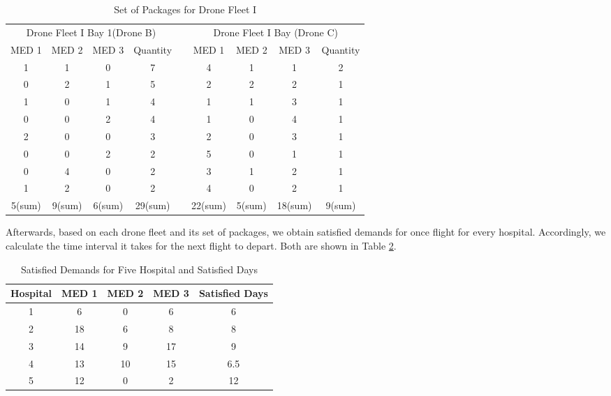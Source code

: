 \documentclass{mcmthesis}
\begin{document}
\begin{table}[htbp]
  \centering
  \caption{Set of Packages for Drone Fleet I}
    \begin{tabular}{ccccccccc}
    \hline
    \multicolumn{4}{c}{Drone Fleet I Bay 1(Drone B)} &       & \multicolumn{4}{c}{Drone Fleet I Bay (Drone C)} \\
    MED 1 & MED 2 & MED 3 & Quantity &       & MED 1 & MED 2 & MED 3 & Quantity \\
    \hline
    1     & 1     & 0     & 7     &       & 4     & 1     & 1     & 2 \\
    0     & 2     & 1     & 5     &       & 2     & 2     & 2     & 1 \\
    1     & 0     & 1     & 4     &       & 1     & 1     & 3     & 1 \\
    0     & 0     & 2     & 4     &       & 1     & 0     & 4     & 1 \\
    2     & 0     & 0     & 3     &       & 2     & 0     & 3     & 1 \\
    0     & 0     & 2     & 2     &       & 5     & 0     & 1     & 1 \\
    0     & 4     & 0     & 2     &       & 3     & 1     & 2     & 1 \\
    1     & 2     & 0     & 2     &       & 4     & 0     & 2     & 1 \\
    \hline
    5(sum) & 9(sum) & 6(sum) & 29(sum) &  & 22(sum)    & 5(sum)     & 18(sum)    & 9(sum)\\
    \hline
    \end{tabular}%
  \label{Tab:seto2}%
\end{table}%

\noindent Afterwards, based on each drone fleet and its set of packages, we obtain satisfied demands for once flight for every hospital. Accordingly, we calculate the time interval it takes for the next flight to depart. Both are shown in Table \ref{Tab:sati}.
\begin{table}[htbp]
  \centering
  \caption{Satisfied Demands for Five Hospital and Satisfied Days}
    \begin{tabular}{c|ccc|c}
    \hline
    Hospital & MED 1 & MED 2 & MED 3 & Satisfied Days \\
    \hline
    1     & 6     & 0     & 6     & 6 \\
    2     & 18    & 6     & 8     & 8 \\
    3     & 14    & 9     & 17    & 9 \\
    4     & 13    & 10    & 15    & 6.5 \\
    5     & 12    & 0     & 2     & 12 \\
    \hline
    \end{tabular}%
  \label{Tab:sati}%
\end{table}%
\end{document}
